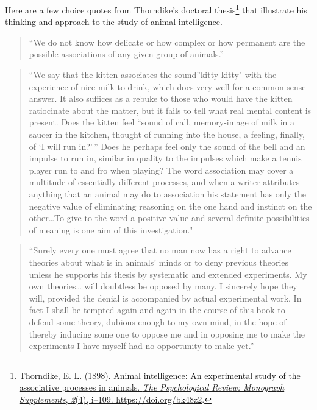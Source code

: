 \documentclass[
  oneside,
  12pt]{crumpbook}
\begin{document}
Here are a few choice quotes from Thorndike's doctoral thesis\footnote{\protect\hyperlink{ref-thorndikeAnimalIntelligenceExperimental1898}{Thorndike, E. L. (1898). Animal intelligence: {An} experimental study of the associative processes in animals. \emph{The Psychological Review: Monograph Supplements}, \emph{2}(4), i--109. \url{https://doi.org/bk48z2}}.} that illustrate his thinking and approach to the study of animal intelligence.

\begin{quote}
``We do not know how delicate or how complex or how permanent are the possible associations of any given group of animals.''
\end{quote}

\begin{quote}
``We say that the kitten associates the sound''kitty kitty" with the experience of nice milk to drink, which does very well for a common-sense answer. It also suffices as a rebuke to those who would have the kitten ratiocinate about the matter, but it fails to tell what real mental content is present. Does the kitten feel ``sound of call, memory-image of milk in a saucer in the kitchen, thought of running into the house, a feeling, finally, of `I will run in?'\,'' Does he perhaps feel only the sound of the bell and an impulse to run in, similar in quality to the impulses which make a tennis player run to and fro when playing? The word association may cover a multitude of essentially different processes, and when a writer attributes anything that an animal may do to association his statement has only the negative value of eliminating reasoning on the one hand and instinct on the other\ldots To give to the word a positive value and several definite possibilities of meaning is one aim of this investigation."
\end{quote}

\begin{quote}
``Surely every one must agree that no man now has a right to advance theories about what is in animals' minds or to deny previous theories unless he supports his thesis by systematic and extended experiments. My own theories\ldots{} will doubtless be opposed by many. I sincerely hope they will, provided the denial is accompanied by actual experimental work. In fact I shall be tempted again and again in the course of this book to defend some theory, dubious enough to my own mind, in the hope of thereby inducing some one to oppose me and in opposing me to make the experiments I have myself had no opportunity to make yet.''
\end{quote}
\end{document}
